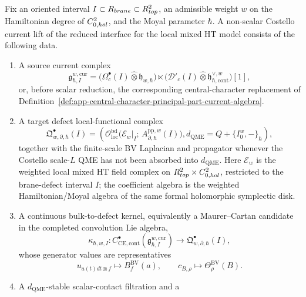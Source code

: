 \begin{defn}
\label{def:app-unreduced-nonscalar-current-lift-datum}
  Fix an oriented interval
  \(I\subset R_{brane}\subset R^2_{top}\), an
  admissible weight \(w\) on the Hamiltonian degree of
  \(C^2_{0,hol}\), and the Moyal parameter
  \(\hbar\).  A non-scalar Costello current lift of the reduced interface
  for the local mixed HT model consists of the following data.
  \begin{enumerate}
    \item A source current complex
    \[
      \mathfrak g^{w,\mathrm{cur}}_{\hbar,I}
        =
        \bigl(\Omega^\bullet_c(I)\widehat\otimes
        \mathfrak h_{w,\hbar}\bigr)
        \ltimes
        \bigl(\mathcal D'_c(I)\widehat\otimes
        \mathfrak h^{\vee,w}_{\hbar,\mathrm{cont}}\bigr)[1],
    \]
    or, before scalar reduction, the corresponding central-character
    replacement of
    Definition~\ref{def:app-central-character-principal-part-current-algebra}.
    \item A target defect local-functional complex
    \[
      \mathfrak Q^\bullet_{w,\partial,\hbar}(I)
        =
        \left(
        \mathcal O_{\mathrm{loc}}^{\mathrm{bd}}\bigl(
          \mathcal E_w|_I;\,
          A^{\mathrm{pp},w}_{\partial,\hbar}(I)\bigr),
        d_{\mathrm{QME}}=Q+\{I_0^w,-\}_{\hbar}
        \right),
    \]
    together with the finite-scale BV Laplacian and propagator whenever
    the Costello scale-\(L\) QME has not been absorbed into
    \(d_{\mathrm{QME}}\).
    Here \(\mathcal E_w\) is the weighted local mixed HT field complex on
    \(R^2_{top}\times C^2_{0,hol}\),
    restricted to the brane-defect interval \(I\); the coefficient
    algebra is the weighted Hamiltonian/Moyal algebra of the same formal
    holomorphic symplectic disk.
    \item A continuous bulk-to-defect kernel, equivalently a Maurer--Cartan
    candidate in the completed convolution Lie algebra,
    \[
      \kappa_{\hbar,w,I}\colon
      C^\bullet_{\mathrm{CE},\mathrm{cont}}
      (\mathfrak g^{w,\mathrm{cur}}_{\hbar,I})
      \longrightarrow
      \mathfrak Q^\bullet_{w,\partial,\hbar}(I),
    \]
    whose generator values are representatives
    \[
      u_{a(t)dt\otimes f}\longmapsto B_f^{\mathrm{BV}}(a),
      \qquad
      c_{B,\rho}\longmapsto\Theta_\rho^{\mathrm{BV}}(B).
    \]
    \item A \(d_{\mathrm{QME}}\)-stable scalar-contact filtration and a

\end{enumerate}
\end{defn}
